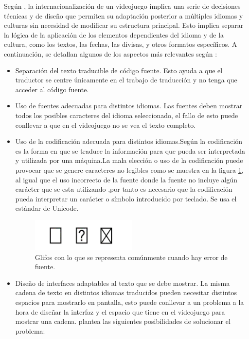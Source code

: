 Según \cite{LQAPSM2017}, la internacionalización de un videojuego implica una serie de decisiones técnicas y de diseño que permiten su adaptación posterior a múltiples idiomas y culturas sin necesidad de modificar su estructura principal. Esto implica separar la lógica de la aplicación de los elementos dependientes del idioma y de la cultura, como los textos, las fechas, las divisas, y otros formatos específicos. A continuación, se detallan algunos de los aspectos más relevantes según  \cite{LQAPSM2017}:
\begin{itemize}
	\item Separación del texto traducible de código fuente. Esto ayuda a que el traductor se centre únicamente en el trabajo de traducción y no tenga que acceder al código fuente.
	\item Uso de fuentes adecuadas para distintos idiomas. Las fuentes deben mostrar todos los posibles caracteres del idioma seleccionado, el fallo de esto puede conllevar a que en el videojuego no se vea el texto completo.
	\item Uso de la codificación adecuada para distintos idiomas.Según \cite{Codificacion} la codificación es la forma en que se traduce la información para que pueda ser interpretada y utilizada por una máquina.La mala elección o uso de la codificación puede provocar que se genere caracteres no legibles como se muestra en la figura \ref{fig:EFontC}, al igual que el uso incorrecto de la fuente donde la fuente no incluye algún carácter que se esta utilizando ,por tanto es necesario que la codificación pueda interpretar un carácter o símbolo introducido por teclado. Se usa el estándar de Unicode.
	\begin{figure}[H]
		\centering
		\includegraphics[width = 0.5\textwidth]{Imagenes/Errores_Localizacion/E_Font_C.png}
		\caption{Glifos con lo que se representa comúnmente cuando hay error de fuente.}
		\label{fig:EFontC}
	\end{figure}
	\item Diseño de interfaces adaptables al texto que se debe mostrar. La misma cadena de texto en distintos idiomas traducidos pueden necesitar distintos espacios para mostrarlo en pantalla, esto puede conllevar a un problema a la hora de diseñar la interfaz y el espacio que tiene en el videojuego para mostrar una cadena.
	\cite{LQAPSM2017} plantea las siguientes posibilidades de solucionar el problema:
	

\end{itemize}
